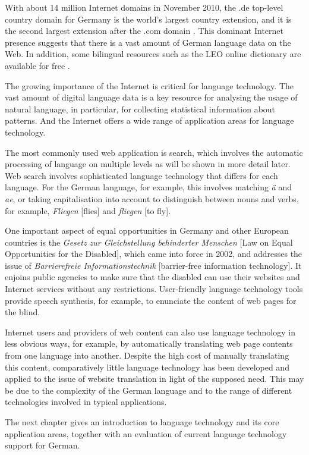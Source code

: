 \documentclass[]{../../metanetpaper}
\begin{document}
\begin{multicols}{2}
With about 14 million Internet domains in November 2010, the .de top-level country domain for Germany is the world’s largest country extension, and it is the second largest extension after the .com domain \cite{denic1,ebrands1}. This dominant Internet presence suggests that there is a vast amount of German language data on the Web. In addition, some bilingual resources such as the LEO online dictionary are available for free \cite{leo1}.


The growing importance of the Internet is critical for language technology. The vast amount of digital language data is a key resource for analysing the usage of natural language, in particular, for collecting statistical information about patterns. And the Internet offers a wide range of application areas for language technology. 

The most commonly used web application is search, which involves the automatic processing of language on multiple levels as will be shown in more detail later. Web search involves sophisticated language technology that differs for each language. For the German language, for example, this involves matching \textit{ä} and \textit{ae}, or taking capitalisation into account to distinguish between nouns and verbs, for example, \textit{Fliegen} [flies] and \textit{fliegen} [to fly]. 

One important aspect of equal opportunities in Germany and other European countries is the \textit{Gesetz zur Gleichstellung behinderter Menschen} [Law on Equal Opportunities for the Disabled], which came into force in 2002, and addresses the issue of \textit{Barrierefreie Informationstechnik} [barrier-free information technology]. It enjoins public agencies to make sure that the disabled can use their websites and Internet services without any restrictions. User-friendly language technology tools provide speech synthesis, for example, to enunciate the content of web pages for the blind.


Internet users and providers of web content can also use language technology in less obvious ways, for example, by automatically translating web page contents from one language into another. Despite the high cost of manually translating this content, comparatively little language technology has been developed and applied to the issue of website translation in light of the supposed need. This may be due to the complexity of the German language and to the range of different technologies involved in typical applications. 

The next chapter gives an introduction to language technology and its core application areas, together with an evaluation of current language technology support for German.
\end{multicols}
\end{document}
